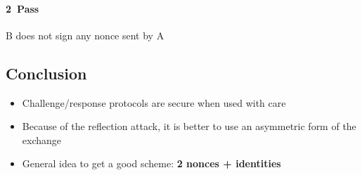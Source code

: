 \paragraph{2~Pass} B does not sign any nonce sent by A

\subsection{Conclusion}
\begin{itemize}
    \item Challenge/response protocols are secure when used with care
    \item Because of the reflection attack, it is better to use an
        asymmetric form of the exchange
    \item General idea to get a good scheme: \textbf{2 nonces +
        identities}
\end{itemize}
